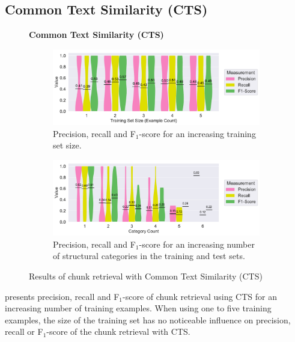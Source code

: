 \subsection{Common Text Similarity (CTS)}
\label{sec:r:cts}
\begin{figure}
\centering
    \textbf{Common Text Similarity (CTS)}\par\medskip
\begin{subfigure}[t]{\columnwidth}
		\centering
		\includegraphics[width=\columnwidth,
		clip]{img/big-study/recall-precision-examplecount-CTS.pdf}
		\caption{Precision, recall and F$_{1}$-score for an
		increasing training set size.}
		\label{fig:recall-precision-examplecount-CTS}

\end{subfigure}\hspace{\fill}
\begin{subfigure}[t]{\columnwidth}
		\centering
				\includegraphics[width=\columnwidth,
				clip]{img/big-study/recall-precision-categorycount-CTS.pdf}
		\caption{Precision, recall and F$_{1}$-score for
		an increasing number of structural categories in the
		training and test sets.}
		\label{fig:recall-precision-categorycount-CTS}
\end{subfigure}
\caption{Results of chunk retrieval with Common Text Similarity (CTS)}
\end{figure}

 presents precision,
recall and F$_{1}$-score of chunk retrieval using CTS for an
increasing number of training examples.
When using one to five
training examples, the size of the training set has no noticeable
influence on precision, recall or F$_{1}$-score of the chunk retrieval
with CTS.

